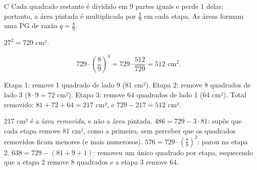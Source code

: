 \begin{resolucao}{C}
 Cada quadrado restante é dividido em
9 partes iguais e perde 1 delas; portanto, a área pintada é multiplicada por
$\frac{8}{9}$ em cada etapa. As áreas formam uma PG de razão $q = \frac89$.

 $27^2 = 729$ cm².

\[
729 \cdot \left(\frac{8}{9}\right)^3 = 729 \cdot \frac{512}{729} = 512 \text{ cm}^2 .
\]

 Etapa 1: remove 1 quadrado de lado
9 (81 cm²). Etapa 2: remove 8 quadrados de lado 3 ($8 \cdot 9 = 72$ cm²).
Etapa 3: remove 64 quadrados de lado 1 (64 cm²). Total removido:
$81 + 72 + 64 = 217$ cm², e $729 - 217 = 512$ cm².


\begin{distratores}
 217 cm² é a área \emph{removida}, e não a área pintada.
 $486 = 729 - 3\cdot 81$: supôs que cada etapa remove 81 cm², como a
primeira, sem perceber que os quadrados removidos ficam menores (e mais
numerosos).
 $576 = 729 \cdot \left(\frac89\right)^2$: parou na etapa 2.
 $638 = 729 - (81 + 9 + 1)$: removeu um único quadrado por etapa,
esquecendo que a etapa 2 remove 8 quadrados e a etapa 3 remove 64.
\end{distratores}
\end{resolucao}


